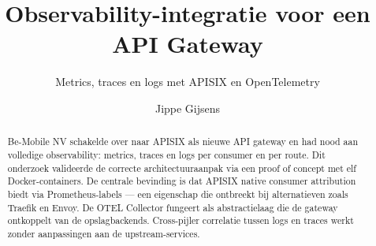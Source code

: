 \documentclass[a0,portrait]{hogent-poster}
\title{Observability-integratie voor een API Gateway}
\subtitle{Metrics, traces en logs met APISIX en OpenTelemetry}
\author{Jippe Gijsens}
\begin{document}
\maketitle

\begin{abstract}
Be-Mobile NV schakelde over naar APISIX als nieuwe API gateway en had nood aan volledige observability: metrics, traces en logs per consumer en per route. Dit onderzoek valideerde de correcte architectuuraanpak via een proof of concept met elf Docker-containers. De centrale bevinding is dat APISIX native consumer attribution biedt via Prometheus-labels --- een eigenschap die ontbreekt bij alternatieven zoals Traefik en Envoy. De OTEL Collector fungeert als abstractielaag die de gateway ontkoppelt van de opslagbackends. Cross-pijler correlatie tussen logs en traces werkt zonder aanpassingen aan de upstream-services.
\end{abstract}
\end{document}
